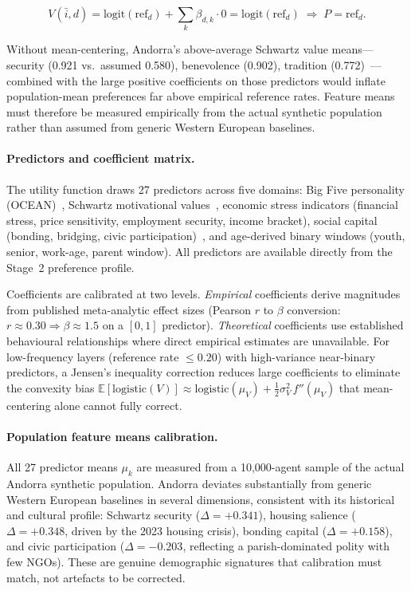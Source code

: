 \documentclass[a4paper,12pt]{article}
\begin{document}
\begin{equation}
  V(\bar{i}, d)
    = \mathrm{logit}(\mathrm{ref}_d) + \sum_k \beta_{d,k} \cdot 0
    = \mathrm{logit}(\mathrm{ref}_d)
  \;\Rightarrow\; P = \mathrm{ref}_d.
\end{equation}

Without mean-centering, Andorra's above-average Schwartz value means---security
(0.921 vs.\ assumed 0.580), benevolence (0.902), tradition
(0.772)~\cite{schwartz1992universals}---combined with the large positive
coefficients on those predictors would inflate population-mean preferences far
above empirical reference rates. Feature means must therefore be measured
empirically from the actual synthetic population rather than assumed from
generic Western European baselines.

\paragraph{Predictors and coefficient matrix.}
The utility function draws 27 predictors across five domains: Big Five
personality (OCEAN)~\cite{mccrae2003personality}, Schwartz motivational
values~\cite{schwartz1992universals}, economic stress indicators (financial
stress, price sensitivity, employment security, income bracket), social capital
(bonding, bridging, civic participation)~\cite{putnam2000bowling}, and
age-derived binary windows (youth, senior, work-age, parent window). All
predictors are available directly from the Stage~2 preference profile.

Coefficients are calibrated at two levels. \emph{Empirical} coefficients derive
magnitudes from published meta-analytic effect sizes (Pearson $r$ to $\beta$
conversion: $r \approx 0.30 \Rightarrow \beta \approx 1.5$ on a $[0,1]$
predictor). \emph{Theoretical} coefficients use established behavioural
relationships where direct empirical estimates are unavailable. For low-frequency
layers (reference rate $\leq 0.20$) with high-variance near-binary
predictors, a Jensen's inequality correction reduces large coefficients to
eliminate the convexity bias $\mathbb{E}[\mathrm{logistic}(V)] \approx
\mathrm{logistic}(\mu_V) + \frac{1}{2}\sigma^2_V\,f''(\mu_V)$ that
mean-centering alone cannot fully correct.

\paragraph{Population feature means calibration.}
All 27 predictor means $\mu_k$ are measured from a 10,000-agent sample of
the actual Andorra synthetic population. Andorra deviates substantially from
generic Western European baselines in several dimensions, consistent with its
historical and cultural profile: Schwartz security ($\Delta = +0.341$),
housing salience ($\Delta = +0.348$, driven by the 2023 housing crisis),
bonding capital ($\Delta = +0.158$), and civic participation
($\Delta = -0.203$, reflecting a parish-dominated polity with few NGOs).
These are genuine demographic signatures that calibration must match, not
artefacts to be corrected.
\end{document}
